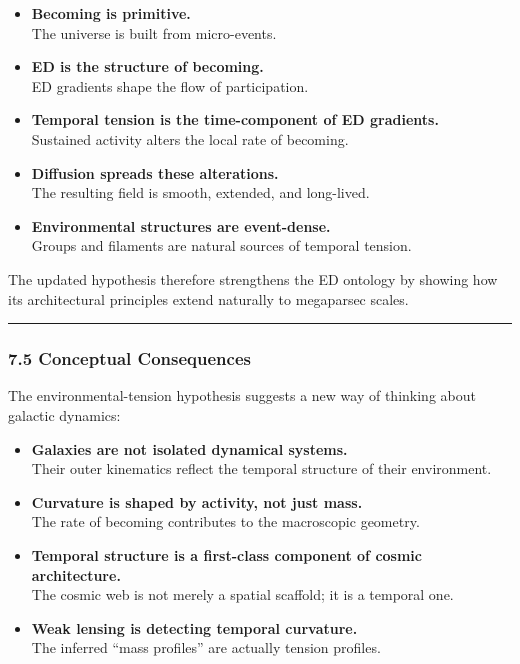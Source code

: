 \begin{itemize}
\item
  \textbf{Becoming is primitive.}\\
  The universe is built from micro-events.
\item
  \textbf{ED is the structure of becoming.}\\
  ED gradients shape the flow of participation.
\item
  \textbf{Temporal tension is the time-component of ED gradients.}\\
  Sustained activity alters the local rate of becoming.
\item
  \textbf{Diffusion spreads these alterations.}\\
  The resulting field is smooth, extended, and long-lived.
\item
  \textbf{Environmental structures are event-dense.}\\
  Groups and filaments are natural sources of temporal tension.
\end{itemize}

The updated hypothesis therefore strengthens the ED ontology by showing
how its architectural principles extend naturally to megaparsec scales.

\begin{center}\rule{0.5\linewidth}{0.5pt}\end{center}

\subsubsection{7.5 Conceptual
Consequences}\label{conceptual-consequences}

The environmental-tension hypothesis suggests a new way of thinking
about galactic dynamics:

\begin{itemize}
\item
  \textbf{Galaxies are not isolated dynamical systems.}\\
  Their outer kinematics reflect the temporal structure of their
  environment.
\item
  \textbf{Curvature is shaped by activity, not just mass.}\\
  The rate of becoming contributes to the macroscopic geometry.
\item
  \textbf{Temporal structure is a first-class component of cosmic
  architecture.}\\
  The cosmic web is not merely a spatial scaffold; it is a temporal one.
\item
  \textbf{Weak lensing is detecting temporal curvature.}\\
  The inferred ``mass profiles'' are actually tension profiles.
\end{itemize}

